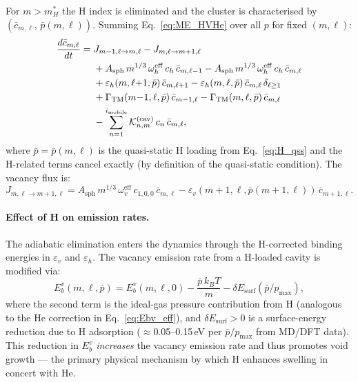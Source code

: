 \documentclass[pdflatex,sn-basic]{sn-jnl} %
\begin{document}
For $m > m_H^*$ the H index is eliminated and the cluster is
characterised by $(\bar{c}_{m,\ell},\,\bar{p}(m,\ell))$.  Summing
Eq.~\eqref{eq:ME_HVHe} over all $p$ for fixed $(m,\ell)$:
\begin{equation}\label{eq:ME_cbar_ml}
\begin{split}
\frac{d\bar{c}_{m,\ell}}{dt}
= {} &
    J_{m-1,\ell \to m,\ell} - J_{m,\ell \to m+1,\ell}
  \\
  &+ A_{\mathrm{sph}}\,m^{1/3}\,\omega_h^{\mathrm{eff}}\,c_h\,
     \bar{c}_{m,\ell-1}
   - A_{\mathrm{sph}}\,m^{1/3}\,\omega_h^{\mathrm{eff}}\,c_h\,
     \bar{c}_{m,\ell}
  \\
  &+ \varepsilon_h(m,\ell{+}1,\bar{p})\,\bar{c}_{m,\ell+1}
   - \varepsilon_h(m,\ell,\bar{p})\,\bar{c}_{m,\ell}\,\delta_{\ell\geq 1}
  \\
  &+ \Gamma_{\mathrm{TM}}(m{-}1,\ell,\bar{p})\,\bar{c}_{m-1,\ell}
   - \Gamma_{\mathrm{TM}}(m,\ell,\bar{p})\,\bar{c}_{m,\ell}
  \\
  &- \sum_{n=1}^{i_{\rm mobile}}
     \mathcal{K}_{n,m}^{(\mathrm{cav})}\,c_n\,\bar{c}_{m,\ell},
\end{split}
\end{equation}
where $\bar{p} = \bar{p}(m,\ell)$ is the quasi-static H loading from
Eq.~\eqref{eq:H_qss} and the H-related terms cancel exactly (by
definition of the quasi-static condition).  The vacancy flux is:
\begin{equation}\label{eq:Jvml}
    J_{m,\ell \to m+1,\ell}
    = A_{\mathrm{sph}}\,m^{1/3}\,\omega_v^{\mathrm{eff}}\,
      c_{1,0,0}\,\bar{c}_{m,\ell}
    - \varepsilon_v(m{+}1,\ell,\bar{p}(m{+}1,\ell))\,
      \bar{c}_{m+1,\ell}.
\end{equation}

\paragraph{Effect of H on emission rates.}
The adiabatic elimination enters the dynamics through the H-corrected
binding energies in $\varepsilon_v$ and $\varepsilon_h$.  The vacancy
emission rate from a H-loaded cavity is modified via:
\begin{equation}\label{eq:Ebv_H}
    E_b^v(m,\ell,\bar{p})
    = E_b^v(m,\ell,0)
    - \frac{\bar{p}\,k_BT}{m}
    - \delta E_{\mathrm{surf}}(\bar{p}/p_{\max}),
\end{equation}
where the second term is the ideal-gas pressure contribution from H
(analogous to the He correction in Eq.~\ref{eq:Ebv_eff}), and
$\delta E_{\mathrm{surf}} > 0$ is a surface-energy reduction due to H
adsorption ($\approx$0.05--0.15\,eV per $\bar{p}/p_{\max}$ from
MD/DFT data).  This reduction in $E_b^v$ \emph{increases} the vacancy
emission rate and thus promotes void growth --- the primary physical
mechanism by which H enhances swelling in concert with He.
\end{document}
